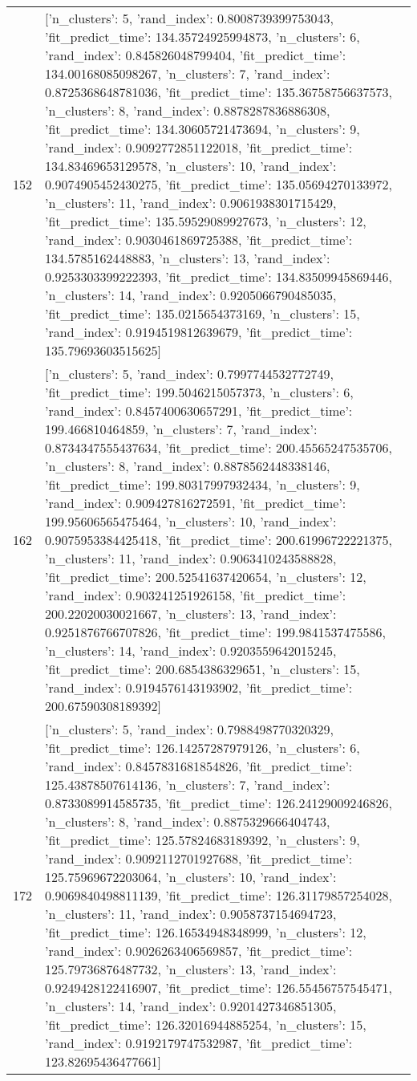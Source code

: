 \begin{tabular}{rl}
152 & [{'n_clusters': 5, 'rand_index': 0.8008739399753043, 'fit_predict_time': 134.35724925994873}, {'n_clusters': 6, 'rand_index': 0.845826048799404, 'fit_predict_time': 134.00168085098267}, {'n_clusters': 7, 'rand_index': 0.8725368648781036, 'fit_predict_time': 135.36758756637573}, {'n_clusters': 8, 'rand_index': 0.8878287836886308, 'fit_predict_time': 134.30605721473694}, {'n_clusters': 9, 'rand_index': 0.9092772851122018, 'fit_predict_time': 134.83469653129578}, {'n_clusters': 10, 'rand_index': 0.9074905452430275, 'fit_predict_time': 135.05694270133972}, {'n_clusters': 11, 'rand_index': 0.9061938301715429, 'fit_predict_time': 135.59529089927673}, {'n_clusters': 12, 'rand_index': 0.9030461869725388, 'fit_predict_time': 134.5785162448883}, {'n_clusters': 13, 'rand_index': 0.9253303399222393, 'fit_predict_time': 134.83509945869446}, {'n_clusters': 14, 'rand_index': 0.9205066790485035, 'fit_predict_time': 135.0215654373169}, {'n_clusters': 15, 'rand_index': 0.9194519812639679, 'fit_predict_time': 135.79693603515625}] \\
162 & [{'n_clusters': 5, 'rand_index': 0.7997744532772749, 'fit_predict_time': 199.5046215057373}, {'n_clusters': 6, 'rand_index': 0.8457400630657291, 'fit_predict_time': 199.466810464859}, {'n_clusters': 7, 'rand_index': 0.8734347555437634, 'fit_predict_time': 200.45565247535706}, {'n_clusters': 8, 'rand_index': 0.8878562448338146, 'fit_predict_time': 199.80317997932434}, {'n_clusters': 9, 'rand_index': 0.909427816272591, 'fit_predict_time': 199.95606565475464}, {'n_clusters': 10, 'rand_index': 0.9075953384425418, 'fit_predict_time': 200.61996722221375}, {'n_clusters': 11, 'rand_index': 0.9063410243588828, 'fit_predict_time': 200.52541637420654}, {'n_clusters': 12, 'rand_index': 0.903241251926158, 'fit_predict_time': 200.22020030021667}, {'n_clusters': 13, 'rand_index': 0.9251876766707826, 'fit_predict_time': 199.9841537475586}, {'n_clusters': 14, 'rand_index': 0.9203559642015245, 'fit_predict_time': 200.6854386329651}, {'n_clusters': 15, 'rand_index': 0.9194576143193902, 'fit_predict_time': 200.67590308189392}] \\
172 & [{'n_clusters': 5, 'rand_index': 0.7988498770320329, 'fit_predict_time': 126.14257287979126}, {'n_clusters': 6, 'rand_index': 0.8457831681854826, 'fit_predict_time': 125.43878507614136}, {'n_clusters': 7, 'rand_index': 0.8733089914585735, 'fit_predict_time': 126.24129009246826}, {'n_clusters': 8, 'rand_index': 0.8875329666404743, 'fit_predict_time': 125.57824683189392}, {'n_clusters': 9, 'rand_index': 0.9092112701927688, 'fit_predict_time': 125.75969672203064}, {'n_clusters': 10, 'rand_index': 0.9069840498811139, 'fit_predict_time': 126.31179857254028}, {'n_clusters': 11, 'rand_index': 0.9058737154694723, 'fit_predict_time': 126.16534948348999}, {'n_clusters': 12, 'rand_index': 0.9026263406569857, 'fit_predict_time': 125.79736876487732}, {'n_clusters': 13, 'rand_index': 0.9249428122416907, 'fit_predict_time': 126.55456757545471}, {'n_clusters': 14, 'rand_index': 0.9201427346851305, 'fit_predict_time': 126.32016944885254}, {'n_clusters': 15, 'rand_index': 0.9192179747532987, 'fit_predict_time': 123.82695436477661}] \\

\end{tabular}
